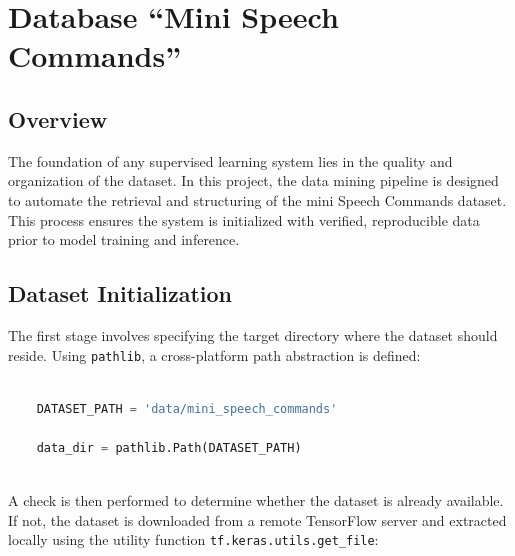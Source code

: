 %
%
\chapter{Database ``Mini Speech Commands''}


\section{Overview}



The foundation of any supervised learning system lies in the quality and organization of the dataset. In this project, the data mining pipeline is designed to automate the retrieval and structuring of the mini Speech Commands dataset. This process ensures the system is initialized with verified, reproducible data prior to model training and inference.



\bigskip



\section{Dataset Initialization}



The first stage involves specifying the target directory where the dataset should reside. Using \texttt{pathlib}, a cross-platform path abstraction is defined:



\begin{lstlisting}[language=Python, caption={Dataset path definition}]
    
    DATASET_PATH = 'data/mini_speech_commands'
    
    data_dir = pathlib.Path(DATASET_PATH)
    
\end{lstlisting}



\bigskip



A check is then performed to determine whether the dataset is already available. If not, the dataset is downloaded from a remote TensorFlow server and extracted locally using the utility function \texttt{tf.keras.utils.get\_file}:



